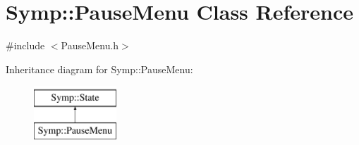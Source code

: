 \hypertarget{class_symp_1_1_pause_menu}{\section{Symp\-:\-:Pause\-Menu Class Reference}
\label{class_symp_1_1_pause_menu}
}


{\ttfamily \#include $<$Pause\-Menu.\-h$>$}

Inheritance diagram for Symp\-:\-:Pause\-Menu\-:\begin{figure}[H]
\begin{center}
\leavevmode
\includegraphics[height=2.000000cm]{class_symp_1_1_pause_menu}
\end{center}
\end{figure}
